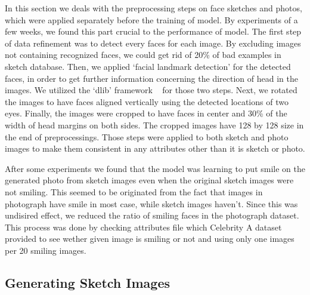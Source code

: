In this section we deals with the preprocessing steps on face sketches and photos, which were applied separately before the training of model. By experiments of a few weeks, we found this part crucial to the performance of model. 
The first step of data refinement was to detect every faces for each image. By excluding images not containing recognized faces, we could get rid of 20\% of bad examples in sketch database. Then, we applied `facial landmark detection' for the detected faces, in order to get further information concerning the direction of head in the images. We utilized the `dlib' framework ~\cite{dlib} for those two steps.
Next, we rotated the images to have faces aligned vertically using the detected locations of two eyes.
Finally, the images were cropped to have faces in center and 30\% of the width of head margins on both sides. The cropped images have 128 by 128 size in the end of preprocessings. Those steps were applied to both sketch and photo images to make them consistent in any attributes other than it is sketch or photo. 

After some experiments we found that the model was learning to put smile on the generated photo from sketch images even when the original sketch images were not smiling. This seemed to be originated from the fact that images in photograph have smile in most case, while sketch images haven't. Since this was undisired effect, we reduced the ratio of smiling faces in the photograph dataset. This process was done by checking attributes file which Celebrity A dataset provided to see wether given image is smiling or not and using only one images per 20 smiling images.

\subsection{Generating Sketch Images}

\endinput
